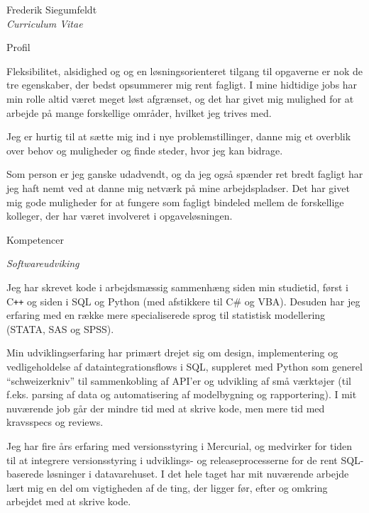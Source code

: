 \documentclass[a4paper]{article}
\newcommand*{\ac}[1]{\mbox{#1}}
\begin{document}
\begin{cv}{Frederik Siegumfeldt\\{\large \itshape Curriculum Vitae}}
\begin{cvlist}{Profil}
  \item

    Fleksibilitet, alsidighed og og en løsningsorienteret tilgang til 
    opgaverne er nok de tre egenskaber, der bedst opsummerer mig rent 
    fagligt. I mine hidtidige jobs har min rolle altid været meget løst 
    afgrænset, og det har givet mig mulighed for at arbejde på mange 
    forskellige områder, hvilket jeg trives med.

    Jeg er hurtig til at sætte mig ind i nye problemstillinger, 
    danne mig et overblik over behov og muligheder og finde steder, 
    hvor jeg kan bidrage.

    Som person er jeg ganske udadvendt, og da jeg også spænder ret bredt
    fagligt har jeg haft nemt ved at danne mig netværk på mine 
    arbejdspladser. Det har givet mig gode muligheder for at fungere som
    fagligt bindeled mellem de forskellige kolleger, der har været 
    involveret i opgaveløsningen.

\end{cvlist}

\begin{cvlist}{Kompetencer}          

  \item[\emph{Softwareudviking}]

    Jeg har skrevet kode i arbejdsmæssig sammenhæng siden min 
    studietid, først i C{}\verb!++! og siden i SQL og Python 
    (med afstikkere til C\# og VBA). Desuden har jeg erfaring med en 
    række mere specialiserede sprog til statistisk modellering 
    (\ac{STATA}, \ac{SAS} og \ac{SPSS}).

    Min udviklingserfaring har primært drejet sig om design, 
    implementering og vedligeholdelse af dataintegrationsflows i SQL,
    suppleret med Python som generel ``schweizer\-kniv'' til
    sammenkobling af API'er og udvikling af små værktøjer (til
    f.eks. parsing af data og automatisering af modelbygning og
    rapportering). I mit nuværende job går der mindre tid med at 
    skrive kode, men mere tid med kravsspecs og reviews.

    Jeg har fire års erfaring med versionsstyring i Mercurial, og 
    medvirker for tiden til at integrere versionsstyring i udviklings-
    og release\-processerne for de rent SQL-baserede løsninger i 
    datavarehuset. I det hele taget har mit nuværende arbejde lært mig 
    en del om vigtigheden af de ting, der ligger før, efter og omkring 
    arbejdet med at skrive kode.


\end{cvlist}
\end{cv}
\end{document}
